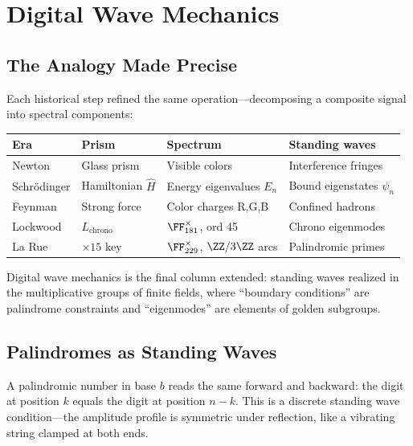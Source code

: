 \section{Digital Wave Mechanics}

\subsection{The Analogy Made Precise}

Each historical step refined the same operation---decomposing a composite signal into spectral components:

\begin{center}
\begin{tabular}{@{}llll@{}}
\toprule
\textbf{Era} & \textbf{Prism} & \textbf{Spectrum} & \textbf{Standing waves} \\
\midrule
Newton & Glass prism & Visible colors & Interference fringes \\
Schr\"odinger & Hamiltonian $\hat{H}$ & Energy eigenvalues $E_n$ & Bound eigenstates $\psi_n$ \\
Feynman & Strong force & Color charges R,G,B & Confined hadrons \\
Lockwood & $L_{\mathrm{chrono}}$ & $\FF_{181}^\times$, ord 45 & Chrono eigenmodes \\
La Rue & $\times 15$ key & $\FF_{229}^\times$, $\ZZ/3\ZZ$ arcs & Palindromic primes \\
\bottomrule
\end{tabular}
\end{center}

Digital wave mechanics is the final column extended: standing waves realized in the multiplicative groups of finite fields, where ``boundary conditions'' are palindrome constraints and ``eigenmodes'' are elements of golden subgroups.

\subsection{Palindromes as Standing Waves}

A palindromic number in base $b$ reads the same forward and backward: the digit at position $k$ equals the digit at position $n - k$. This is a discrete standing wave condition---the amplitude profile is symmetric under reflection, like a vibrating string clamped at both ends.

